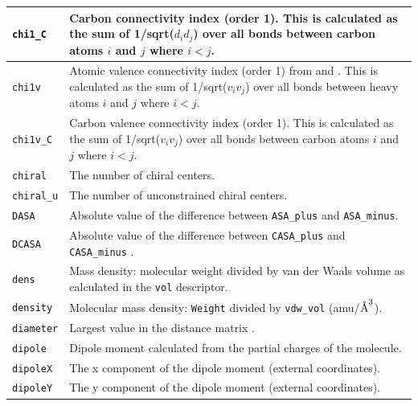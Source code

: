 \documentclass[12pt,a4paper]{article}
\newcommand{\angstrom}{\mbox{\normalfont\AA}}
\begin{document}
\begin{longtable}{@{\zz}|p{}|p{}|}
\texttt{chi1\_C} & Carbon connectivity index (order 1). This is calculated as 
the sum of 1/sqrt($d_id_j$) over all bonds between carbon atoms $i$ and $j$ where 
$i < j$.\\ \hline 

\texttt{chi1v} & Atomic valence connectivity index (order 1) from 
\cite{Hall1991} and \cite{Kier1977}. This is calculated as the sum of 
1/sqrt($v_iv_j$) over all bonds between heavy atoms $i$ and $j$ where $i < j$.\\ 
\hline

\texttt{chi1v\_C} & Carbon valence connectivity index (order 1). This is 
calculated as the sum of 1/sqrt($v_iv_j$) over all bonds between carbon atoms 
$i$ and $j$ where $i < j$.\\ \hline

\texttt{chiral} & The number of chiral centers.\\ \hline

\texttt{chiral\_u} & The number of unconstrained chiral centers.\\ \hline

\texttt{DASA} & Absolute value of the difference between \texttt{ASA\_plus} 
and \texttt{ASA\_minus}.\\ \hline

\texttt{DCASA} & Absolute value of the difference between \texttt{CASA\_plus} 
and \texttt{CASA\_minus} \cite{Stanton1990}.\\ \hline

\texttt{dens} & Mass density: molecular weight divided by van der Waals volume 
as calculated in the \texttt{vol} descriptor.\\ \hline

\texttt{density} & Molecular mass density: \texttt{Weight} divided by 
\texttt{vdw\_vol} (amu/$\angstrom^3$).\\ \hline

\texttt{diameter} & Largest value in the distance matrix \cite{Petitjean1992}.
\\ \hline

\texttt{dipole} & Dipole moment calculated from the partial charges of the 
molecule.\\ \hline

\texttt{dipoleX} & The x component of the dipole moment (external coordinates).\\ 
\hline

\texttt{dipoleY} & The y component of the dipole moment (external coordinates).\\ 
\hline


\end{longtable}
\end{document}
